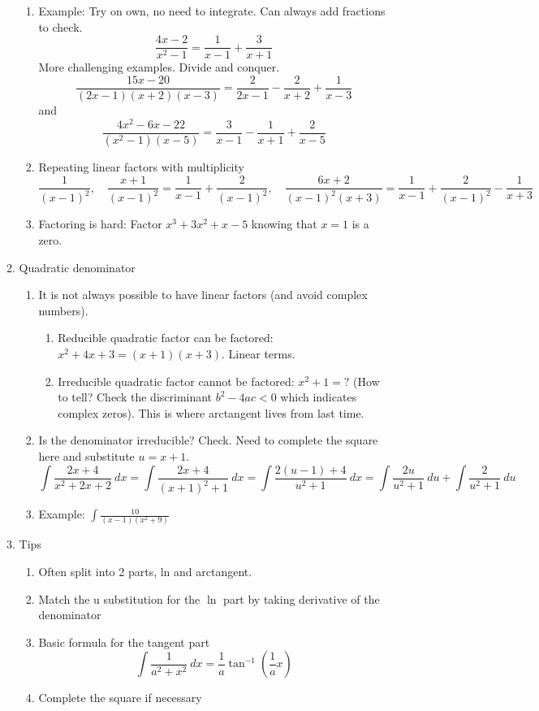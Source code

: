 \documentclass{article}
\newcommand{\ds}{\displaystyle}
\begin{document}
\begin{enumerate}
\begin{enumerate}
\begin{enumerate}
\item Example: Try on own, no need to integrate. Can always add fractions to check.
$$
\frac{4x-2}{x^2-1} = \frac{1}{x-1}+\frac{3}{x+1}
$$
More challenging examples. Divide and conquer.
$$
\frac{15x-20}{(2x-1)(x+2)(x-3)} = \frac{2}{2x-1}-\frac{2}{x+2}+\frac{1}{x-3}
$$
and
$$
\frac{4x^2-6x-22}{(x^2-1)(x-5)} = \frac{3}{x-1}-\frac{1}{x+1}+\frac{2}{x-5}
$$

\item Repeating linear factors with multiplicity
$$
\frac{1}{(x-1)^2}, \quad \frac{x+1}{(x-1)^2} = \frac{1}{x-1}+\frac{2}{(x-1)^2},\quad \frac{6x+2}{(x-1)^2(x+3)} = \frac{1}{x-1}+\frac{2}{(x-1)^2}-\frac{1}{x+3}
$$
\item Factoring is hard: Factor $x^3+3x^2+x-5$ knowing that $x=1$ is a zero.
\end{enumerate}

\item Quadratic denominator
\begin{enumerate}

\item It is not always possible to have linear factors (and avoid complex numbers).
\begin{enumerate}
\item Reducible quadratic factor can be factored: $x^2+4x+3 = (x+1)(x+3)$. Linear terms.
\item Irreducible quadratic factor cannot be factored: $x^2+1=?$ (How to tell? Check the discriminant $b^2-4ac<0$ which indicates complex zeros). 
This is where arctangent lives from last time.
\end{enumerate}

\item Is the denominator irreducible? Check. Need to complete the square here and substitute $u=x+1$.
$$
\int \frac{2x+4}{x^2+2x+2} ~dx = \int \frac{2x+4}{(x+1)^2 +1}~dx =  \int \frac{2(u-1)+4}{u^2 +1}~dx = \int \frac{2u}{u^2+1}~du + \int \frac{2}{u^2+1}~du
$$

\item Example: $\ds \int \frac{10}{(x-1)(x^2+9)}$
\end{enumerate}

\item Tips
\begin{enumerate}
\item Often split into 2 parts, ln and arctangent.
\item Match the u substitution for the $\ln$ part by taking derivative of the denominator 
\item Basic formula for the tangent part
$$
\int\frac{1}{a^2+x^2} ~dx = \frac{1}{a}\tan^{-1}(\frac{1}{a}x)
$$
\item Complete the square if necessary
\end{enumerate}


\end{enumerate}
\end{enumerate}
\end{document}

